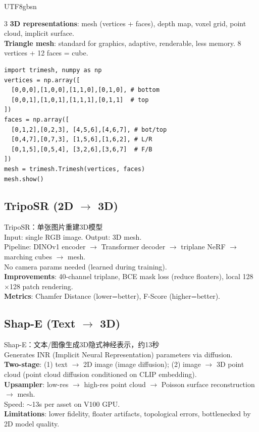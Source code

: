 \documentclass[9pt,landscape,a4paper]{article}
\newcommand{\zhint}[1]{{\scriptsize\color{gray!70!black}#1}}
\begin{document}
\begin{CJK}{UTF8}{gbsn}
\begin{multicols}{3}
\textbf{3D representations}: mesh (vertices + faces), depth map, voxel grid, point cloud, implicit surface.\\
\textbf{Triangle mesh}: standard for graphics, adaptive, renderable, less memory. 8 vertices + 12 faces = cube.
\begin{lstlisting}
import trimesh, numpy as np
vertices = np.array([
  [0,0,0],[1,0,0],[1,1,0],[0,1,0], # bottom
  [0,0,1],[1,0,1],[1,1,1],[0,1,1]  # top
])
faces = np.array([
  [0,1,2],[0,2,3], [4,5,6],[4,6,7], # bot/top
  [0,4,7],[0,7,3], [1,5,6],[1,6,2], # L/R
  [0,1,5],[0,5,4], [3,2,6],[3,6,7]  # F/B
])
mesh = trimesh.Trimesh(vertices, faces)
mesh.show()
\end{lstlisting}

\subsection{TripoSR (2D $\to$ 3D)}
\zhint{TripoSR：单张图片重建3D模型}\\
Input: single RGB image. Output: 3D mesh.\\
Pipeline: DINOv1 encoder $\to$ Transformer decoder $\to$ triplane NeRF $\to$ marching cubes $\to$ mesh.\\
No camera params needed (learned during training).\\
\textbf{Improvements}: 40-channel triplane, BCE mask loss (reduce floaters), local 128$\times$128 patch rendering.\\
\textbf{Metrics}: Chamfer Distance (lower=better), F-Score (higher=better).

\subsection{Shap-E (Text $\to$ 3D)}
\zhint{Shap-E：文本/图像生成3D隐式神经表示，约13秒}\\
Generates INR (Implicit Neural Representation) parameters via diffusion.\\
\textbf{Two-stage}: (1) text $\to$ 2D image (image diffusion); (2) image $\to$ 3D point cloud (point cloud diffusion conditioned on CLIP embedding).\\
\textbf{Upsampler}: low-res $\to$ high-res point cloud $\to$ Poisson surface reconstruction $\to$ mesh.\\
Speed: $\sim$13s per asset on V100 GPU.\\
\textbf{Limitations}: lower fidelity, floater artifacts, topological errors, bottlenecked by 2D model quality.


\end{multicols}
\end{CJK}
\end{document}
